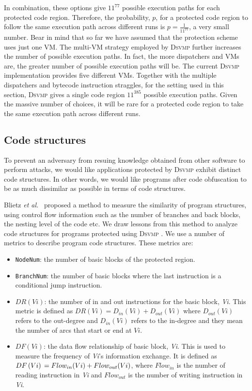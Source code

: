 \documentclass[times]{secauth}
\newcommand{\DSVMP}{\textsc{Dsvmp }}
\begin{document}
In combination, these options give $11^{77}$ possible execution paths for each protected code region.
Therefore, the probability, $p$, for a protected code region to follow the same execution path across
different runs is $p= \frac{1}{{{{11}^{77}}}}$,
a very small number.
Bear in mind that so far we have assumed that the protection scheme uses just one VM.
The multi-VM strategy employed by \DSVMP further increases the number of possible execution paths.
In fact, the more dispatchers and VMs are, the greater number of possible execution paths will be.
The current \DSVMP implementation provides five different VMs. Together with the multiple dispatchers
and bytecode instruction straggles, for the setting used in this section, \DSVMP gives a single code region
$11^{385}$ possible execution paths. Given the massive number of choices, it will be rare for
a protected code region to take the same execution path across different runs.




\subsection{Code structures}
To prevent an adversary from resuing knowledge obtained from other software to perform attacks,
we would like applications protected by \DSVMP exhibit distinct code structures. In other words,
we would like programs after code obfuscation to be as much dissimilar as possible in terms of code structures.


Blietz \emph{et al.}~\cite{18blietz2006software} proposed a method to measure the similarity of program structures,
using control flow information such as the number of branches and back blocks, the nesting level of the code etc.
We draw lessons from this method to analyze code structures for programs protected using \DSVMP.
We use a number of metrics to describe program code structures. These metrics are:

\begin{itemize}
\item \texttt{NodeNum}: the number of basic blocks of the protected region.
\item \texttt{BranchNum}: the number of basic blocks where the last instruction is a conditional jump instruction.
\item $DR(Vi)$: the number of in and out instructions for the basic block, \emph{Vi}. This metric is defined as $DR(Vi) = {D_{in}}(Vi) + {D_{out}}(Vi)$ where ${D_{out}}\left( {Vi} \right)$ refers to the out-degree and ${D_{in}}\left( {Vi} \right)$ refers to the in-degree and they mean the number of arcs that start or end at $Vi$.
\item $DF(Vi)$: the data flow relationship of basic block, \emph{Vi}. This is used to measure the frequency of \emph{Vi}'s information exchange. It is defined as $DF\left( {Vi} \right){\rm{ }} = {\rm{ }}Flo{w_{in}}(Vi) + Flo{w_{out}}(Vi)$, where $Flo{w_{in}}$ is the number of reading instruction in \emph{Vi} and $Flo{w_{out}}$ is the number of writing instruction in \emph{Vi}.
\end{itemize}
\end{document}
